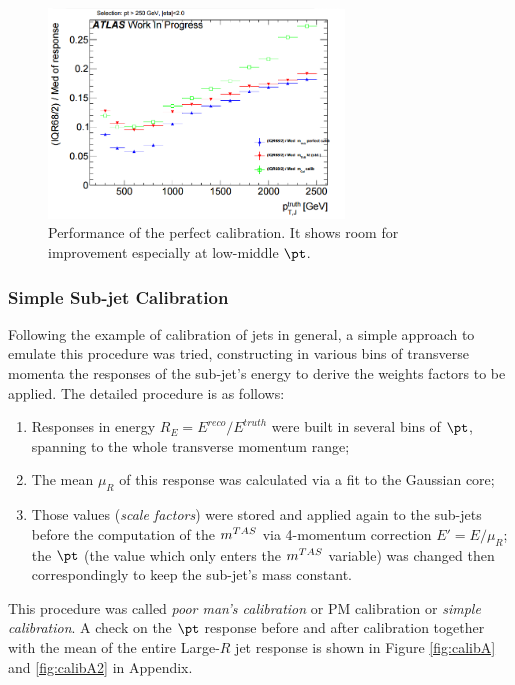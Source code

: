 \begin{figure}[!ht]
  \centering
      \includegraphics[width=0.7\textwidth]{jet_part/calib/perfcalib.png}
  \caption[Perfect calibration]{Performance of the perfect calibration. It shows room for improvement especially at low-middle $\pt$.}
  \label{fig:perfcalib}
\end{figure}


\subsubsection{Simple Sub-jet Calibration}
Following the example of calibration of jets in general, a simple approach to emulate this procedure was tried, constructing in various bins of transverse momenta the responses of the sub-jet's energy to derive the weights factors to be applied. The detailed procedure is as follows:
\begin{enumerate}
 \item Responses in energy $R_E=E^{reco}/E^{truth}$ were built in several bins of $\pt$, spanning to the whole transverse momentum range;
 \item The mean $\mu_R$ of this response was calculated via a fit to the Gaussian core;
 \item Those values (\textit{scale factors}) were stored and applied again to the sub-jets before the computation of the $m^{TAS}$ via 4-momentum correction $E'=E/\mu_R$; the $\pt$ (the value which only enters the $m^{TAS}$ variable) was changed then correspondingly to keep the sub-jet's mass constant.
\end{enumerate}

This procedure was called \textit{poor man's calibration} or PM calibration or \textit{simple calibration}.
A check on the $\pt$ response before and after calibration together with the mean of the entire Large-$R$ jet response is shown in Figure \ref{fig:calibA} and \ref{fig:calibA2} in Appendix.

